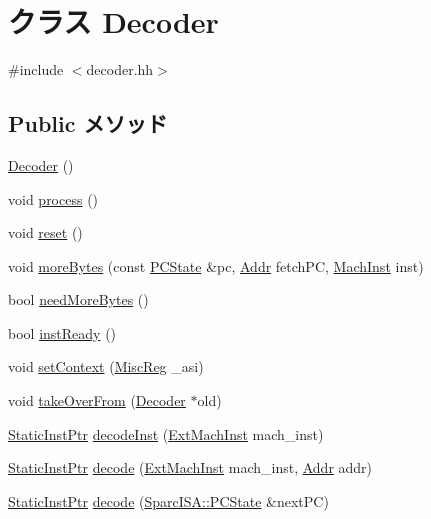 \hypertarget{classSparcISA_1_1Decoder}{
\section{クラス Decoder}
\label{classSparcISA_1_1Decoder}
}


{\ttfamily \#include $<$decoder.hh$>$}\subsection*{Public メソッド}
\begin{DoxyCompactItemize}
\item 
\hyperlink{classSparcISA_1_1Decoder_aedfa2b7d97ed17b14903ed75d6214c78}{Decoder} ()
\item 
void \hyperlink{classSparcISA_1_1Decoder_a2e9c5136d19b1a95fc427e0852deab5c}{process} ()
\item 
void \hyperlink{classSparcISA_1_1Decoder_ad20897c5c8bd47f5d4005989bead0e55}{reset} ()
\item 
void \hyperlink{classSparcISA_1_1Decoder_a85a99c8dd9425508bee9a17836dbbd12}{moreBytes} (const \hyperlink{classGenericISA_1_1DelaySlotUPCState}{PCState} \&pc, \hyperlink{base_2types_8hh_af1bb03d6a4ee096394a6749f0a169232}{Addr} fetchPC, \hyperlink{namespaceSparcISA_a301c22ea09fa33dcfe6ddf22f203699c}{MachInst} inst)
\item 
bool \hyperlink{classSparcISA_1_1Decoder_a35631c47fc45b69ca30e6551f9f5d1d1}{needMoreBytes} ()
\item 
bool \hyperlink{classSparcISA_1_1Decoder_a9f6a0bc8946ca58d5d59a5dbc6a3181f}{instReady} ()
\item 
void \hyperlink{classSparcISA_1_1Decoder_a65c69bb25bb272d1f2dc6556abc47677}{setContext} (\hyperlink{namespaceSparcISA_aa16539aa6584fd12f7d6fa868f75b4de}{MiscReg} \_\-asi)
\item 
void \hyperlink{classSparcISA_1_1Decoder_a83393f90e7cbd98eda9721ba6022d0e0}{takeOverFrom} (\hyperlink{classSparcISA_1_1Decoder}{Decoder} $\ast$old)
\item 
\hyperlink{classRefCountingPtr}{StaticInstPtr} \hyperlink{classSparcISA_1_1Decoder_a148768e0e9062eb41f604040d0ea86e6}{decodeInst} (\hyperlink{namespaceSparcISA_aec686c38e40c7f794f1435591c15c275}{ExtMachInst} mach\_\-inst)
\item 
\hyperlink{classRefCountingPtr}{StaticInstPtr} \hyperlink{classSparcISA_1_1Decoder_a4ed948f8d08575cc2916fe32154ea69d}{decode} (\hyperlink{namespaceSparcISA_aec686c38e40c7f794f1435591c15c275}{ExtMachInst} mach\_\-inst, \hyperlink{base_2types_8hh_af1bb03d6a4ee096394a6749f0a169232}{Addr} addr)
\item 
\hyperlink{classRefCountingPtr}{StaticInstPtr} \hyperlink{classSparcISA_1_1Decoder_a1a256bfe4c8b7dd7e067a4925dd3e9a4}{decode} (\hyperlink{classGenericISA_1_1DelaySlotUPCState}{SparcISA::PCState} \&nextPC)
\end{DoxyCompactItemize}
